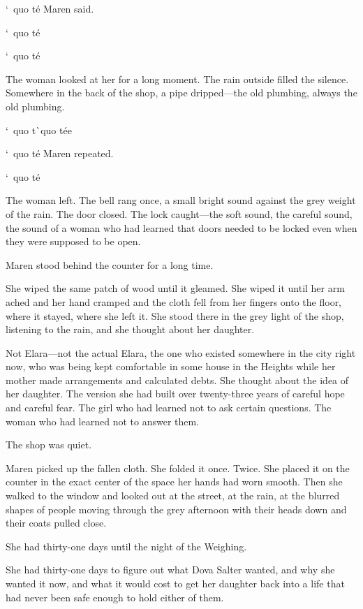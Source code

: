 \documentclass[12pt,letterpaper,openany]{book}
\begin{document}
\par
`\ quo t\'e{} Maren said.
\par
`\ quo t\'e{}
\par
`\ quo t\'e{}
\par
The woman looked at her for a long moment. The rain outside filled the silence. Somewhere in the back of the shop, a pipe dripped—the old plumbing, always the old plumbing.
\par
`\ quo t\`\ quo t\'e{}e{}
\par
`\ quo t\'e{} Maren repeated.
\par
`\ quo t\'e{}
\par
The woman left. The bell rang once, a small bright sound against the grey weight of the rain. The door closed. The lock caught—the soft sound, the careful sound, the sound of a woman who had learned that doors needed to be locked even when they were supposed to be open.
\par
Maren stood behind the counter for a long time.
\par
She wiped the same patch of wood until it gleamed. She wiped it until her arm ached and her hand cramped and the cloth fell from her fingers onto the floor, where it stayed, where she left it. She stood there in the grey light of the shop, listening to the rain, and she thought about her daughter.
\par
Not Elara—not the actual Elara, the one who existed somewhere in the city right now, who was being kept comfortable in some house in the Heights while her mother made arrangements and calculated debts. She thought about the idea of her daughter. The version she had built over twenty-three years of careful hope and careful fear. The girl who had learned not to ask certain questions. The woman who had learned not to answer them.
\par
The shop was quiet.
\par
Maren picked up the fallen cloth. She folded it once. Twice. She placed it on the counter in the exact center of the space her hands had worn smooth. Then she walked to the window and looked out at the street, at the rain, at the blurred shapes of people moving through the grey afternoon with their heads down and their coats pulled close.
\par
She had thirty-one days until the night of the Weighing.
\par
She had thirty-one days to figure out what Dova Salter wanted, and why she wanted it now, and what it would cost to get her daughter back into a life that had never been safe enough to hold either of them.
\end{document}
